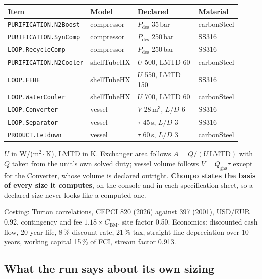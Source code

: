 \documentclass[11pt,a4paper]{article}
\begin{document}
{\small\begin{longtable}{@{}L{0.35\linewidth}L{0.15\linewidth}L{0.28\linewidth}L{0.14\linewidth}@{}}
\toprule
\textbf{Item} & \textbf{Model} & \textbf{Declared} & \textbf{Material} \\
\midrule
\endhead
\texttt{PURIFICATION.N2Boost}  & compressor  & $P_{\mathrm{des}}$ 35\,bar & carbonSteel \\
\texttt{PURIFICATION.SynComp}  & compressor  & $P_{\mathrm{des}}$ 250\,bar & SS316 \\
\texttt{LOOP.RecycleComp}      & compressor  & $P_{\mathrm{des}}$ 250\,bar & SS316 \\
\texttt{PURIFICATION.N2Cooler} & shellTubeHX & $U$ 500, LMTD 60 & carbonSteel \\
\texttt{LOOP.FEHE}             & shellTubeHX & $U$ 550, LMTD 150 & SS316 \\
\texttt{LOOP.WaterCooler}      & shellTubeHX & $U$ 700, LMTD 60 & carbonSteel \\
\texttt{LOOP.Converter}        & vessel      & $V$ 28\,m$^3$, $L/D$ 6 & SS316 \\
\texttt{LOOP.Separator}        & vessel      & $\tau$ 45\,s, $L/D$ 3 & SS316 \\
\texttt{PRODUCT.Letdown}       & vessel      & $\tau$ 60\,s, $L/D$ 3 & carbonSteel \\
\bottomrule
\end{longtable}}

$U$ in W/(m$^2\cdot$K), LMTD in K. Exchanger area follows
$A = Q/(U\,\mathrm{LMTD})$ with $Q$ taken from the unit's own solved duty;
vessel volume follows $V = Q_{\mathrm{gas}}\tau$ except for the Converter,
whose volume is declared outright. \textbf{Choupo states the basis of every
size it computes}, on the console and in each specification sheet, so a declared
size never looks like a computed one.

Costing: Turton correlations, CEPCI 820 (2026) against 397 (2001),
USD/EUR 0.92, contingency and fee $1.18\times C_{\mathrm{BM}}$, site factor
0.50. Economics: discounted cash flow, 20-year life, 8\,\% discount rate,
21\,\% tax, straight-line depreciation over 10 years, working capital 15\,\% of
FCI, stream factor 0.913.

\subsection{What the run says about its own sizing}
\end{document}
